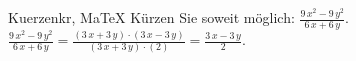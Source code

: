 \begin{MAufgabe}{Kuerzen}{kr, MaTeX}
K\"urzen Sie soweit m\"oglich: $\frac{9\, x^2 - 9\, y^2}{6\, x + 6\, y}$.\\ 
\ifLsg\MLoesung
\quad $\frac{9\, x^2 - 9\, y^2}{6\, x + 6\, y}=\frac{(3\, x + 3\, y)\cdot(3\, x - 3\, y)}{(3\, x + 3\, y)\cdot(2)}=\frac{3\, x - 3\, y}{2}$.\else\relax\fi
 \end{MAufgabe}